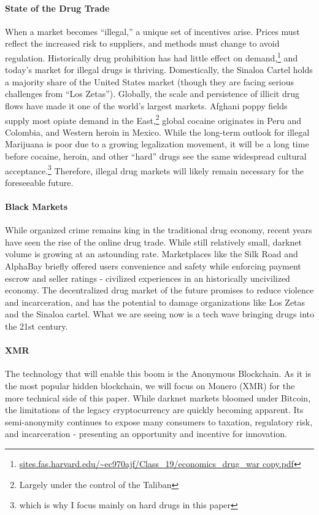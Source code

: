 \documentclass[12pt]{article}
\begin{document}
\paragraph{State of the Drug Trade} When a market becomes ``illegal,'' a unique set of incentives arise. Prices must reflect the increased risk to suppliers, and methods must change to avoid regulation. Historically drug prohibition has had little effect on 
demand,\footnote{\url{sites.fas.harvard.edu/~ec970ajf/Class_19/economics_drug_war copy.pdf}} and today's market for illegal drugs is thriving. Domestically, the Sinaloa Cartel holds a majority share of the United States market (though they are facing serious challenges from ``Los Zetas''). Globally, the scale and persistence of illicit drug flows have made it one of the world's largest markets. Afghani poppy fields supply most opiate demand in the East,\footnote{Largely under the control of the Taliban} global cocaine originates in Peru and Colombia, and Western heroin in Mexico. While the long-term outlook for illegal Marijuana is poor due to a growing legalization movement, it will be a long time before cocaine, heroin, and other ``hard'' drugs see the same widespread cultural acceptance.\footnote{which is why I focus mainly on hard drugs in this paper} Therefore, illegal drug markets will likely remain necessary for the foreseeable future. 


\paragraph{Black Markets} While organized crime remains king in the traditional drug economy, recent years have seen the rise of the online drug trade. While still relatively small, darknet volume is growing at an astounding rate. Marketplaces like the Silk Road and AlphaBay briefly offered users convenience and safety while enforcing payment escrow and seller ratings - civilized experiences in an historically uncivilized economy. The decentralized drug market of the future promises to reduce violence and incarceration, and has the potential to damage organizations like Los Zetas and the Sinaloa cartel. What we are seeing now is a tech wave bringing drugs into the 21st century.


\paragraph{XMR} The technology that will enable this boom is the Anonymous Blockchain. As it is the most popular hidden blockchain, we will focus on Monero (XMR) for the more technical side of this paper. While darknet markets bloomed under Bitcoin, the limitations of the legacy cryptocurrency are quickly becoming apparent. Its semi-anonymity continues to expose many consumers to taxation, regulatory risk, and incarceration - presenting an opportunity and incentive for innovation.
\end{document}
